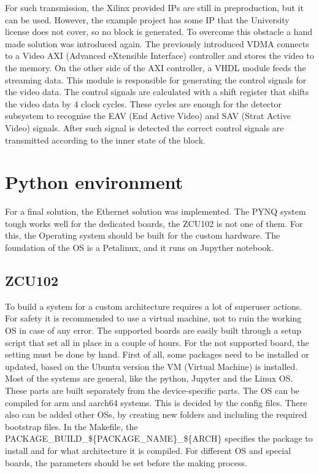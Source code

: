 For such transmission, the Xilinx provided IPs are still in preproduction, but it can be used.
However, the example project has some IP that the University license does not cover, so no block is generated.
To overcome this obstacle a hand made solution was introduced again.
The previously introduced VDMA connects to a Video AXI (Advanced eXtensible Interface) controller and stores the video to the memory.
On the other side of the AXI controller, a VHDL module feeds the streaming data.
This module is responsible for generating the control signals for the video data.
The control signals are calculated with a shift register that shifts the video data by 4 clock cycles.
These cycles are enough for the detector subsystem to recognise the EAV (End Active Video) and SAV (Strat Active Video) signals.
After such signal is detected the correct control signals are transmitted according to the inner state of the block.

\section{Python environment} %
For a final solution, the Ethernet solution was implemented.
The PYNQ system tough works well for the dedicated boards, the ZCU102 is not one of them.
For this, the Operating system should be built for the custom hardware.
The foundation of the OS is a Petalinux, and it runs on Jupyther notebook.

\subsection{ZCU102} %
To build a system for a custom architecture requires a lot of superuser actions.
For safety it is recommended to use a virtual machine, not to ruin the working OS in case of any error.
The supported boards are easily built through a setup script that set all in place in a couple of hours.
For the not supported board, the setting must be done by hand.
First of all, some packages need to be installed or updated, based on the Ubuntu version the VM (Virtual Machine) is installed.
Most of the systems are general, like the python, Jupyter and the Linux OS.
These parts are built separately from the device-specific parts.
The OS can be compiled for arm and aarch64 systems.
This is decided by the config files.
There also can be added other OSs, by creating new folders and including the required bootstrap files.
In the Makefile, the PACKAGE\_BUILD\_\$\{PACKAGE\_NAME\}\_\$\{ARCH\} specifies the package to install and for what architecture it is compiled.
For different OS and special boards, the parameters should be set before the making process.

